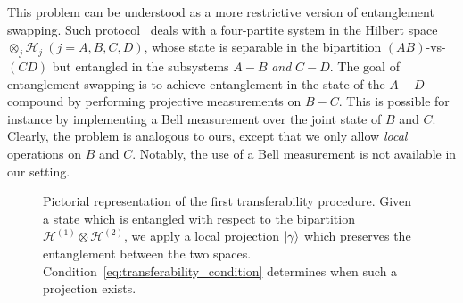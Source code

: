 \documentclass[
	aps, pra,
	superscriptaddress, twocolumn,
	floatfix,
	10pt
]{revtex4-1}
\newcommand{\on}[1]{\operatorname{#1}}
\newcommand{\parTitle}[1]{\noindent{\color{Mahogany}(\emph{#1})}}
\newcommand{\calH}{{\mathcal{H}}}
\newcommand{\calW}{{\mathcal{W}}}
\newcommand{\LI}[1]{\highlight{(LI: \textit{#1})}}
\renewcommand{\parTitle}[1]{}
\begin{document}

\parTitle{Relations with entanglement swapping}
This problem can be understood as a more restrictive version of entanglement swapping.
Such protocol~\cite{zukowski1993eventreadydetectors} deals with a four-partite system in the Hilbert space $\otimes_{j}\calH_{j}~(j=A,B,C,D)$, whose state is  separable in the bipartition $(AB)$-vs-$(CD)$ but entangled in the subsystems $A-B$ {\it and} $C-D$. The goal of entanglement swapping is to achieve  entanglement in the state of the $A-D$ compound by performing projective measurements on $B-C$. This is possible for instance by implementing a Bell measurement over the joint state of $B$ and $C$. Clearly, the problem is analogous to ours, except that we only allow \emph{local} operations on $B$ and $C$. Notably, the use of a Bell measurement is not available in our setting.

\begin{figure}[b]
    \centering
    
    \caption{Pictorial representation of the first transferability procedure.
    Given a state which is entangled with respect to the bipartition $\calH^{(1)}\otimes\calH^{(2)}$, we apply a local projection $\ket\gamma$ which preserves the entanglement between the two spaces.
    Condition~\eqref{eq:transferability_condition} determines when such a projection exists.
    }
    \label{fig:TC1_general_condition_scheme}
\end{figure}
\end{document}
